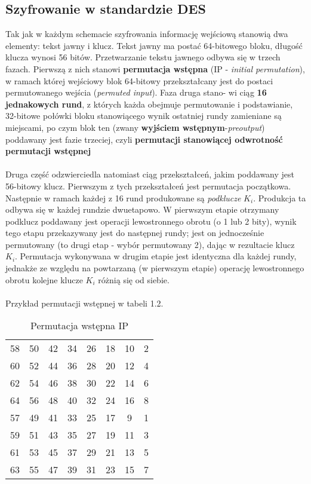 \documentclass[12pt, letterpaper, titlepage]{article}
\begin{document}
\subsection{Szyfrowanie w standardzie DES}
Tak jak w każdym schemacie szyfrowania informację wejściową stanowią dwa elementy: tekst
jawny i klucz. Tekst jawny ma postać 64-bitowego bloku, długość klucza wynosi 56 bitów.
Przetwarzanie tekstu jawnego odbywa się w trzech fazach. Pierwszą z nich stanowi \textbf{permutacja wstępna} (IP - \textit{initial permutation}), w ramach której wejściowy blok 64-bitowy
przekształcany jest do postaci permutowanego wejścia (\textit{permuted input}). Faza druga stano-
wi ciąg \textbf{16 jednakowych rund}, z których każda obejmuje permutowanie i podstawianie,
32-bitowe połówki bloku stanowiącego wynik ostatniej rundy zamieniane są miejscami, po
czym blok ten (zwany \textbf{wyjściem wstępnym}-\textit{preoutput}) poddawany jest fazie trzeciej, czyli
\textbf{permutacji stanowiącej odwrotność permutacji wstępnej}
\\ \\
Druga część odzwierciedla natomiast ciąg przekształceń, jakim poddawany jest 56-bitowy
klucz. Pierwszym z tych przekształceń jest permutacja początkowa. Następnie w ramach
każdej z 16 rund produkowane są \textit{podklucze} $K_i$. Produkcja ta odbywa się w każdej rundzie dwuetapowo. W pierwszym etapie otrzymany podklucz poddawany jest operacji lewostronnego obrotu (o 1 lub 2 bity), wynik tego etapu przekazywany jest do następnej rundy; jest on
jednocześnie permutowany (to drugi etap - wybór permutowany 2), dając w rezultacie klucz
$K_i$. Permutacja wykonywana w drugim etapie jest identyczna dla każdej rundy, jednakże ze
względu na powtarzaną (w pierwszym etapie) operację lewostronnego obrotu kolejne klucze  
$K_i$ różnią się od siebie. \\\\
Przykład permutacji wstępnej w tabeli 1.2.
\begin{table}[h]
\centering\caption{Permutacja wstępna IP}
\begin{tabular}{|cccccccc|}
\hline
58&50&42&34&26&18&10&2\\
60&52&44&36&28&20&12&4\\
62&54&46&38&30&22&14&6\\
64&56&48&40&32&24&16&8\\
57&49&41&33&25&17&9&1\\
59&51&43&35&27&19&11&3\\
61&53&45&37&29&21&13&5\\
63&55&47&39&31&23&15&7\\
\hline
\end{tabular}
\end{table}
\end{document}
